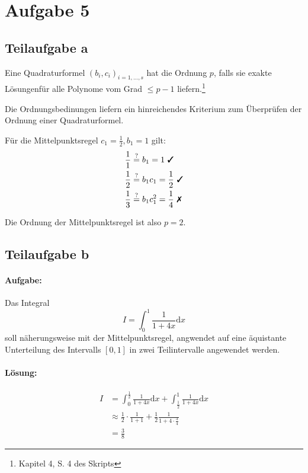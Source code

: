 \section*{Aufgabe 5}
\subsection*{Teilaufgabe a}
Eine Quadraturformel $(b_i, c_i)_{i=1,\dots,s}$ hat die Ordnung
$p$, falls sie exakte Lösungenfür alle Polynome vom Grad $\leq p-1$ liefern.\footnote{Kapitel 4, S. 4 des Skripts}

Die Ordnungsbedinungen liefern ein hinreichendes Kriterium zum Überprüfen
der Ordnung einer Quadraturformel.

Für die Mittelpunktsregel $c_1 = \frac{1}{2}, b_1 = 1$ gilt:
\begin{align}
    \frac{1}{1} &\stackrel{?}{=} b_1 = 1 \text{ \cmark}\\
    \frac{1}{2} &\stackrel{?}{=} b_1 c_1 = \frac{1}{2} \text{ \cmark}\\
    \frac{1}{3} &\stackrel{?}{=} b_1 c_1^2 = \frac{1}{4} \text{ \xmark}
\end{align}

Die Ordnung der Mittelpunktsregel ist also $p=2$.

\subsection*{Teilaufgabe b}
\paragraph*{Aufgabe:}
Das Integral
\[I = \int_0^1 \frac{1}{1+4x} \mathrm{d}x\]
soll näherungsweise mit der Mittelpunktsregel, angwendet auf eine
äquistante Unterteilung des Intervalls $[0,1]$ in zwei Teilintervalle
angewendet werden.

\paragraph*{Lösung:}

\begin{align}
    I &= \int_0^\frac{1}{2} \frac{1}{1+4x} \mathrm{d}x + \int_\frac{1}{2}^1 \frac{1}{1+4x} \mathrm{d}x\\
    &\approx \frac{1}{2} \cdot \frac{1}{1+1} + \frac{1}{2} \frac{1}{1+ 4 \cdot \frac{3}{4}} \\
    &= \frac{3}{8}
\end{align}
